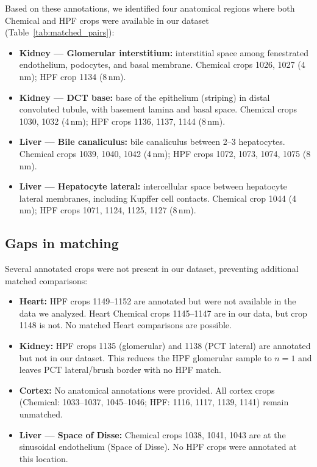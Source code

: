 \documentclass[times, twoside]{zHenriquesLab-StyleBioRxiv}
\begin{document}
Based on these annotations, we identified four anatomical regions where both Chemical and HPF crops were available in our dataset (Table~\ref{tab:matched_pairs}):

\begin{itemize}[nosep]
\item \textbf{Kidney --- Glomerular interstitium:} interstitial space among fenestrated endothelium, podocytes, and basal membrane. Chemical crops 1026, 1027 (4\,nm); HPF crop 1134 (8\,nm).
\item \textbf{Kidney --- DCT base:} base of the epithelium (striping) in distal convoluted tubule, with basement lamina and basal space. Chemical crops 1030, 1032 (4\,nm); HPF crops 1136, 1137, 1144 (8\,nm).
\item \textbf{Liver --- Bile canaliculus:} bile canaliculus between 2--3 hepatocytes. Chemical crops 1039, 1040, 1042 (4\,nm); HPF crops 1072, 1073, 1074, 1075 (8\,nm).
\item \textbf{Liver --- Hepatocyte lateral:} intercellular space between hepatocyte lateral membranes, including Kupffer cell contacts. Chemical crop 1044 (4\,nm); HPF crops 1071, 1124, 1125, 1127 (8\,nm).
\end{itemize}

\subsection*{Gaps in matching}
Several annotated crops were not present in our dataset, preventing additional matched comparisons:

\begin{itemize}[nosep]
\item \textbf{Heart:} HPF crops 1149--1152 are annotated but were not available in the data we analyzed. Heart Chemical crops 1145--1147 are in our data, but crop 1148 is not. No matched Heart comparisons are possible.
\item \textbf{Kidney:} HPF crops 1135 (glomerular) and 1138 (PCT lateral) are annotated but not in our dataset. This reduces the HPF glomerular sample to $n{=}1$ and leaves PCT lateral/brush border with no HPF match.
\item \textbf{Cortex:} No anatomical annotations were provided. All cortex crops (Chemical: 1033--1037, 1045--1046; HPF: 1116, 1117, 1139, 1141) remain unmatched.
\item \textbf{Liver --- Space of Disse:} Chemical crops 1038, 1041, 1043 are at the sinusoidal endothelium (Space of Disse). No HPF crops were annotated at this location.
\end{itemize}
\end{document}
